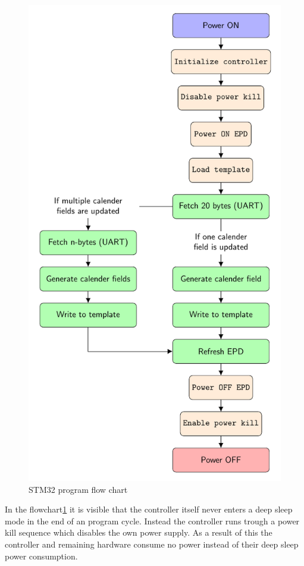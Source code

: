 

\begin{figure}[H]
	\centering
	\includegraphics[height=0.8\textheight]{4-development/software/graphics/main.pdf}
	\caption{STM32 program flow chart\label{software:main}}
\end{figure}
In the flowchart\ref{software:main} it is visible that the controller itself never enters a deep sleep mode in the end of an program cycle. Instead the controller runs trough a power kill sequence which disables the own power supply. As a result of this the controller and remaining hardware consume no power instead of their deep sleep power consumption. 


